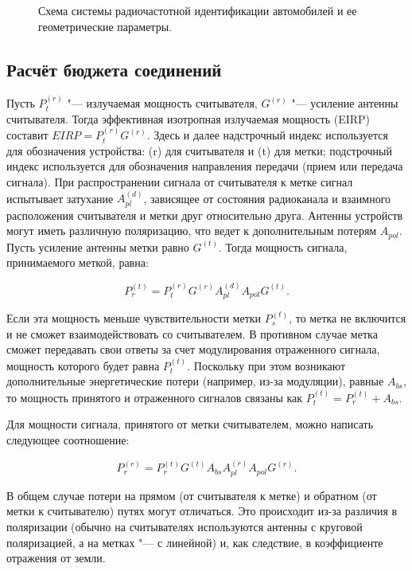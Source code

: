 \begin{figure}[h]
	\caption{Схема системы радиочастотной идентификации автомобилей и ее геометрические параметры.}
	\label{fig:ch2_geometry}
\end{figure}



\subsection{Расчёт бюджета соединений}
Пусть $P_t^{(r)}$ "--- излучаемая мощность считывателя, $G^{(r)}$ "--- усиление антенны считывателя. Тогда эффективная изотропная излучаемая мощность (EIRP) составит $EIRP =  P_t^{(r)} G^{(r)}$. Здесь и далее надстрочный индекс используется для обозначения устройства: (r) для считывателя и (t) для метки; подстрочный индекс используется для обозначения направления передачи (прием или передача сигнала). При распространении сигнала от считывателя к метке сигнал испытывает затухание $A_{pl}^{(d)}$, зависящее от состояния радиоканала и взаимного расположения считывателя и метки друг относительно друга. Антенны устройств могут иметь различную поляризацию, что ведет к дополнительным потерям $A_{pol}$. Пусть усиление антенны метки равно $G^{(t)}$. Тогда мощность сигнала, принимаемого меткой, равна:

$$
	P_r^{(t)} = P_t^{(r)} G^{(r)} A_{pl}^{(d)} A_{pol} G^{(t)}.
$$

Если эта мощность меньше чувствительности метки $P_s^{(t)}$, то метка не включится и не сможет взаимодействовать со считывателем. В противном случае метка сможет передавать свои ответы за счет модулирования отраженного сигнала, мощность которого будет равна $P_t^{(t)}$. Поскольку при этом возникают дополнительные энергетические потери (например, из-за модуляции), равные $A_{bs}$, то мощность принятого и отраженного сигналов связаны как $P_t^{(t)} = P_r^{(t)} + A_{bs}$.

Для мощности сигнала, принятого от метки считывателем, можно написать следующее соотношение:

$$
	P_r^{(r)} = P_r^{(t)} G^{(t)} A_{bs} A_{pl}^{(r)} A_{pol} G^{(r)}.
$$

В общем случае потери на прямом (от считывателя к метке) и обратном (от метки к считывателю) путях могут отличаться. Это происходит из-за различия в поляризации (обычно на считывателях используются антенны с круговой поляризацией, а на метках "--- с линейной) и, как следствие, в коэффициенте отражения от земли.

